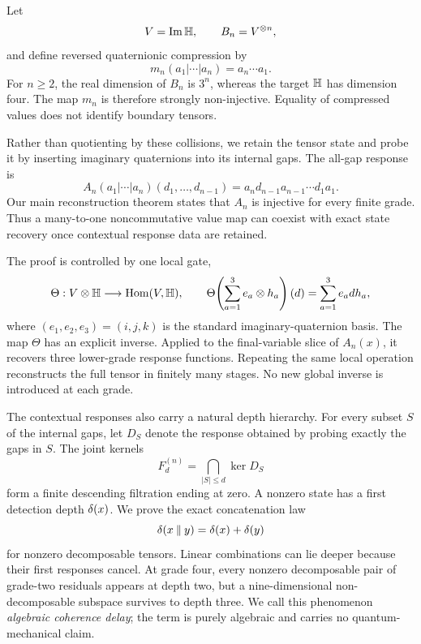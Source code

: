 Let
\[
  V=\operatorname{Im}\mathbb H,\qquad B_n=V^{\otimes n},
\]
and define reversed quaternionic compression by
\begin{equation}\label{eq:compression}
  m_n(a_1|\cdots|a_n)=a_n\cdots a_1.
\end{equation}
For $n\ge 2$, the real dimension of $B_n$ is $3^n$, whereas the target $\mathbb H$ has dimension four.  The map $m_n$ is therefore strongly non-injective.  Equality of compressed values does not identify boundary tensors.

Rather than quotienting by these collisions, we retain the tensor state and probe it by inserting imaginary quaternions into its internal gaps.  The all-gap response is
\begin{equation}\label{eq:all-gap}
  A_n(a_1|\cdots|a_n)(d_1,\ldots,d_{n-1})
  =a_n d_{n-1}a_{n-1}\cdots d_1a_1.
\end{equation}
Our main reconstruction theorem states that $A_n$ is injective for every finite grade.  Thus a many-to-one noncommutative value map can coexist with exact state recovery once contextual response data are retained.

The proof is controlled by one local gate,
\begin{equation}\label{eq:theta}
\Theta:V\otimes\mathbb H\longrightarrow\operatorname{Hom}(V,\mathbb H),\qquad
\Theta\!\left(\sum_{a=1}^3 e_a\otimes h_a\right)(d)
=\sum_{a=1}^3 e_a d h_a,
\end{equation}
where $(e_1,e_2,e_3)=(i,j,k)$ is the standard imaginary-quaternion basis.  The map $\Theta$ has an explicit inverse.  Applied to the final-variable slice of $A_n(x)$, it recovers three lower-grade response functions.  Repeating the same local operation reconstructs the full tensor in finitely many stages.  No new global inverse is introduced at each grade.

The contextual responses also carry a natural depth hierarchy.  For every subset $S$ of the internal gaps, let $D_S$ denote the response obtained by probing exactly the gaps in $S$.  The joint kernels
\[
  F_d^{(n)}=\bigcap_{|S|\le d}\ker D_S
\]
form a finite descending filtration ending at zero.  A nonzero state has a first detection depth $\delta(x)$.  We prove the exact concatenation law
\[
  \delta(x\mathbin{\Vert} y)=\delta(x)+\delta(y)
\]
for nonzero decomposable tensors.  Linear combinations can lie deeper because their first responses cancel.  At grade four, every nonzero decomposable pair of grade-two residuals appears at depth two, but a nine-dimensional non-decomposable subspace survives to depth three.  We call this phenomenon \emph{algebraic coherence delay}; the term is purely algebraic and carries no quantum-mechanical claim.


